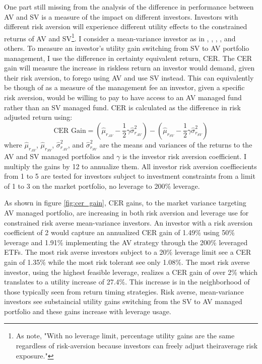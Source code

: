 One part still missing from the analysis of the difference in performance between AV and SV is a measure of the impact on different investors. Investors with different risk aversion will experience different utility effects to the constrained returns of AV and SV\footnote{As \citet{moreira_volatility-managed_2017} note, "With no leverage limit, percentage utility gains are the same regardless of risk-aversion because investors can freely adjust theiraverage risk exposure."}. I consider a mean-variance investor as in \cite{Kandel1996}, \cite{Campbell2008}, \cite{Ferreira2011}, \cite{Rapach2016}, and others. To measure an investor's utility gain switching from SV to AV portfolio management, I use the difference in certainty equivalent return, CER. The CER gain will measure the increase in riskless return an investor would demand, given their risk aversion, to forego using AV and use SV instead. This can equivalently be though of as a measure of the management fee an investor, given a specific risk aversion, would be willing to pay to have access to an AV managed fund rather than an SV managed fund. CER is calculated as the difference in risk adjusted return using:
\begin{equation}
\text{CER Gain} = \left(\hat \mu_{r_{AV}} - \frac{1}{2}\gamma\hat \sigma^{2}_{r_{AV}}\right) - \left(\hat \mu_{r_{SV}} - \frac{1}{2}\gamma\hat \sigma^{2}_{r_{SV}}\right)
\end{equation}
where $\hat \mu_{r_{AV}}$, $\hat \mu_{r_{SV}}$, $\hat \sigma^{2}_{r_{AV}}$, and $\hat \sigma^{2}_{r_{SV}}$ are the means and
variances of the returns to the AV and SV managed portfolios and $\gamma$ is the investor risk aversion coefficient. I multiply the gains by 12 to annualize them. All investor risk aversion coeffiecients from 1 to 5 are tested for investors subject to investment constraints from a limit of 1 to 3 on the market portfolio, no leverage to 200\% leverage.

As shown in figure \ref{fig:cer_gain}, CER gains, to the market variance targeting AV managed portfolio, are increasing in both risk aversion and leverage use for constrained risk averse mean-variance investors. An investor with a risk aversion coefficient of 2 would capture an annualized CER gain of 1.49\% using 50\% leverage and 1.91\% implementing the AV strategy through the 200\% leveraged ETFs. The most risk averse investors subject to a 20\% leverage limit see a CER gain of 1.35\% while the most risk tolerant see only 1.08\%. The most risk averse investor, using the highest feasible leverage, realizes a CER gain of over 2\% which translates to a utility increase of 27.4\%. This increase is in the neighborhood of those typically seen from return timing strategies. \citep{campbell1997econometrics,moreira_volatility-managed_2017} Risk averse, mean-variance investors see substaincial utility gains switching from the SV to AV managed portfolio and these gains increase with leverage usage.

